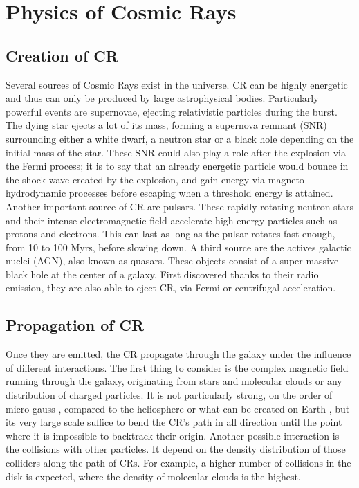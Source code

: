 \newpage
\section{Physics of Cosmic Rays}

\subsection{Creation of CR}
\label{sec:creation_of_CRs}

Several sources of Cosmic Rays exist in the universe. CR can be highly energetic and thus can only be produced by large astrophysical bodies. Particularly powerful events are supernovae, ejecting relativistic particles during the burst. The dying star ejects a lot of its mass, forming a supernova remnant (SNR) surrounding either a white dwarf, a neutron star or a black hole depending on the initial mass of the star. These SNR could also play a role after the explosion via the Fermi process; it is to say that an already energetic particle would bounce in the shock wave created by the explosion, and gain energy via magneto-hydrodynamic processes before escaping when a threshold energy is attained. \cite{Wu1984}
Another important source of CR are pulsars. These rapidly rotating neutron stars and their intense electromagnetic field accelerate high energy particles such as protons and electrons. This can last as long as the pulsar rotates fast enough, from 10 to 100 Myrs, before slowing down.
A third source are the actives galactic nuclei (AGN), also known as quasars. These objects consist of a super-massive black hole at the center of a galaxy. First discovered thanks to their radio emission, they are also able to eject CR, via Fermi or centrifugal acceleration.


\subsection{Propagation of CR}

Once they are emitted, the CR propagate through the galaxy under the influence of different interactions.
The first thing to consider is the complex magnetic field running through the galaxy, originating from stars and molecular clouds or any distribution of charged particles. It is not particularly strong, on the order of micro-gauss \cite{Daniel1975} \cite{Farrar2012}, compared to the heliosphere or what can be created on Earth \cite{Gleeson1968}, but its very large scale suffice to bend the CR's path in all direction until the point where it is impossible to backtrack their origin.
Another possible interaction is the collisions with other particles. It depend on the density distribution of those colliders along the path of CRs. For example, a higher number of collisions in the disk is expected, where the density of molecular clouds is the highest.


